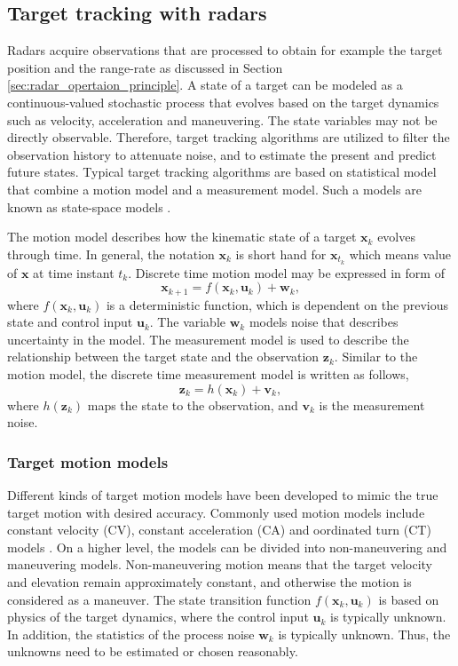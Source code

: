 \documentclass[english, 12pt, a4paper, elec, utf8, a-1b, online]{aaltothesis}
\renewcommand{\vec}[1]{\mathbf{#1}}
\newcommand{\x}{\vec{x}_k}
\newcommand{\xnext}{\vec{x}_{k+1}}
\newcommand{\z}{\vec{z}_k}
\newcommand{\cinput}{\vec{u}_k}
\newcommand{\pnoise}{\vec{w}_k}
\newcommand{\onoise}{\vec{v}_k}
\begin{document}
\subsection{Target tracking with radars} \label{sec:Tracking}

Radars acquire observations that are processed to obtain for example the target position and the range-rate as discussed in Section \ref{sec:radar_opertaion_principle}.
A state of a target can be modeled as a continuous-valued stochastic process that evolves based on the target dynamics such as velocity, acceleration and maneuvering. 
The state variables may not be directly observable.
Therefore, target tracking algorithms are utilized to filter the observation history to attenuate noise, and to estimate the present and predict future states.
Typical target tracking algorithms are based on statistical model that combine a motion model and a measurement model. 
Such a models are known as state-space models \cite{RongLi2003}.

The motion model describes how the kinematic state of a target $\x$ evolves through time.
In general, the notation $\x$ is short hand for $\vec{x}_{t_k}$ which means value of $\vec{x}$ at time instant $t_k$. 
Discrete time motion model may be expressed in form of
\begin{equation}\label{eq:spm_motion}
    \xnext  = f(\x, \cinput) + \pnoise,
\end{equation}
where $f(\x, \cinput)$ is a deterministic function, which is dependent on the previous state and control input $\cinput$. 
The variable $\pnoise$ models noise that describes uncertainty in the model.
The measurement model is used to describe the relationship between the target state and the observation $\z$. 
Similar to the motion model, the discrete time measurement model is written as follows,
\begin{equation}\label{eq:spm_obs}
    \z = h(\x) + \onoise,
\end{equation}
where $h(\z)$ maps the state to the observation, and $\onoise$ is the measurement noise.

\subsubsection{Target motion models} \label{sec:target_models}

Different kinds of target motion models have been developed to mimic the true target motion with desired accuracy. 
Commonly used motion models include constant velocity (CV), constant acceleration (CA) and oordinated turn (CT) models \cite{RongLi2003}.
On a higher level, the models can be divided into non-maneuvering and maneuvering models. 
Non-maneuvering motion means that the target velocity and elevation remain approximately constant, and otherwise the motion is considered as a maneuver.
The state transition function $f(\x, \cinput)$ is based on physics of the target dynamics, where the control input $\cinput$ is typically unknown.
In addition, the statistics of the process noise $\pnoise$ is typically unknown.
Thus, the unknowns need to be estimated or chosen reasonably.  
\end{document}
